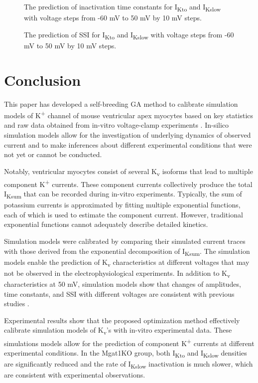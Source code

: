 \documentclass[10pt,letterpaper]{article}
\begin{document}
\begin{figure}[!ht]
    \centering
    \caption{The prediction of inactivation time constants for I\textsubscript{Kto} and I\textsubscript{Kslow} with voltage steps from -60 mV to 50 mV by 10 mV steps.} 
    \label{fig9}
\end{figure}

\begin{figure}[!ht]
    \centering
    \caption{The prediction of SSI for I\textsubscript{Kto} and I\textsubscript{Kslow} with voltage steps from -60 mV to 50 mV by 10 mV steps.} 
    \label{fig10}
\end{figure}

\section*{Conclusion}
This paper has developed a self-breeding GA method to calibrate simulation models of K\textsuperscript{+} channel of mouse ventricular apex myocytes based on key statistics and raw data obtained from in-vitro voltage-clamp experiments \cite{ednie2019reduced}. In-silico simulation models allow for the investigation of underlying dynamics of observed current and to make inferences about different experimental conditions that were not yet or cannot be conducted.

Notably, ventricular myocytes consist of several K\textsubscript{v} isoforms that lead to multiple component K\textsuperscript{+} currents. These component currents collectively produce the total I\textsubscript{Ksum} that can be recorded during in-vitro experiments. Typically, the sum of potassium currents is approximated by fitting multiple exponential functions, each of which is used to estimate the component current. However, traditional exponential functions cannot adequately describe detailed kinetics.

Simulation models were calibrated by comparing their simulated current traces with those derived from the exponential decomposition of I\textsubscript{Ksum}. The simulation models enable the prediction of K\textsubscript{v} characteristics at different voltages that may not be observed in the electrophysiological experiments. In addition to K\textsubscript{v} characteristics at 50 mV, simulation models show that changes of amplitudes, time constants, and SSI with different voltages are consistent with previous studies \cite{ednie2019reduced}.

Experimental results show that the proposed optimization method effectively calibrate simulation models of K\textsubscript{v}'s with in-vitro experimental data. These simulations models allow for the prediction of component K\textsuperscript{+} currents at different experimental conditions. In the Mgat1KO group, both I\textsubscript{Kto} and I\textsubscript{Kslow} densities are significantly reduced and the rate of I\textsubscript{Kslow} inactivation is much slower, which are consistent with experimental observations.
\end{document}
